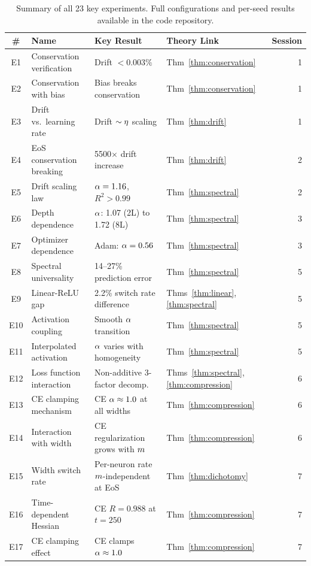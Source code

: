 \begin{table}[h!]
\centering
\small
\caption{Summary of all 23 key experiments. Full configurations and per-seed results available in the code repository.}
\label{tab:experiments}
\begin{tabular}{@{}clllr@{}}
\toprule
\textbf{\#} & \textbf{Name} & \textbf{Key Result} & \textbf{Theory Link} & \textbf{Session} \\
\midrule
E1 & Conservation verification & Drift $< 0.003\%$ & Thm~\ref{thm:conservation} & 1 \\
E2 & Conservation with bias & Bias breaks conservation & Thm~\ref{thm:conservation} & 1 \\
E3 & Drift vs.\ learning rate & Drift $\sim \eta$ scaling & Thm~\ref{thm:drift} & 1 \\
E4 & EoS conservation breaking & 5500$\times$ drift increase & Thm~\ref{thm:drift} & 2 \\
E5 & Drift scaling law & $\alpha = 1.16$, $R^2 > 0.99$ & Thm~\ref{thm:spectral} & 2 \\
E6 & Depth dependence & $\alpha$: 1.07 (2L) to 1.72 (8L) & Thm~\ref{thm:spectral} & 3 \\
E7 & Optimizer dependence & Adam: $\alpha = 0.56$ & Thm~\ref{thm:spectral} & 3 \\
E8 & Spectral universality & 14--27\% prediction error & Thm~\ref{thm:spectral} & 5 \\
E9 & Linear-ReLU gap & 2.2\% switch rate difference & Thms~\ref{thm:linear},\ref{thm:spectral} & 5 \\
E10 & Activation coupling & Smooth $\alpha$ transition & Thm~\ref{thm:spectral} & 5 \\
E11 & Interpolated activation & $\alpha$ varies with homogeneity & Thm~\ref{thm:spectral} & 5 \\
E12 & Loss function interaction & Non-additive 3-factor decomp. & Thms~\ref{thm:spectral},\ref{thm:compression} & 6 \\
E13 & CE clamping mechanism & CE $\alpha \approx 1.0$ at all widths & Thm~\ref{thm:compression} & 6 \\
E14 & Interaction with width & CE regularization grows with $m$ & Thm~\ref{thm:compression} & 6 \\
E15 & Width switch rate & Per-neuron rate $m$-independent at EoS & Thm~\ref{thm:dichotomy} & 7 \\
E16 & Time-dependent Hessian & CE $R = 0.988$ at $t = 250$ & Thm~\ref{thm:compression} & 7 \\
E17 & CE clamping effect & CE clamps $\alpha \approx 1.0$ & Thm~\ref{thm:compression} & 7 \\

\end{tabular}
\end{table}
